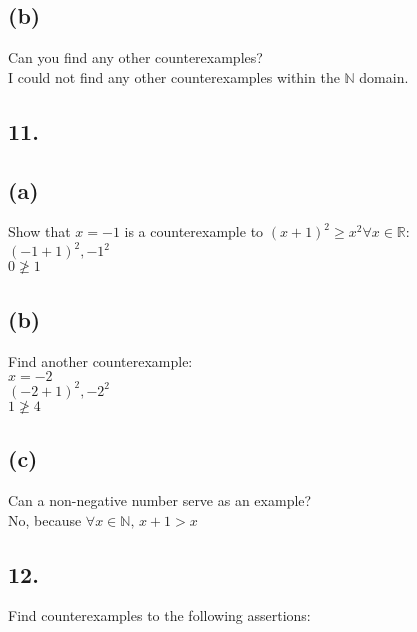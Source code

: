 \documentclass[11pt]{article}
\begin{document}
\subsection*{(b)}
\begin{center}
Can you find any other counterexamples?\\
\hfill \break
I could not find any other counterexamples within the $\mathbb{N}$ domain.
\end{center}
%
%
\subsection*{11.}

\subsection*{(a)}
\begin{center}
Show that $x = -1$ is a counterexample to $(x+1)^{2} \geq x^{2} \forall x \in \mathbb{R}$:\\
\hfill \break
$(-1 + 1)^{2},  -1^{2}$\\
$0 \ngeq 1$
\end{center}

\subsection*{(b)}
\begin{center}
Find another counterexample:\\
\hfill \break
$x = -2$\\
$(-2 + 1)^{2},  -2^{2}$\\
$1 \ngeq 4$
\end{center}

\subsection*{(c)}
\begin{center}
Can a non-negative number serve as an example?\\
\hfill \break
No, because $\forall x \in \mathbb{N} \text{, } x+1 > x$
\end{center}
%
%
\subsection*{12.}
\begin{center}
Find counterexamples to the following assertions:
\end{center}
\end{document}
